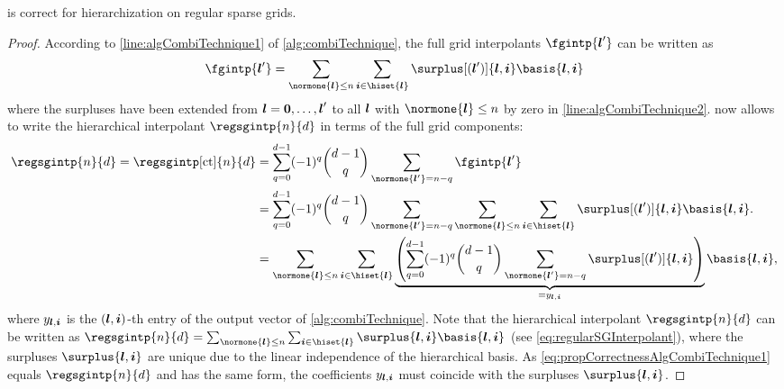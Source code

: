 \begin{proposition}
  \label{prop:correctnessAlgCombiTechnique}
  is correct for hierarchization on regular sparse grids.
\end{proposition}

\begin{proof}
  According to \cref{line:algCombiTechnique1} of \cref{alg:combiTechnique},
  the full grid interpolants $\fgintp{\*l'}$ can be written as
  \begin{equation}
    \fgintp{\*l'}
    = \sum_{\normone{\*l} \le n} \sum_{\*i \in \hiset{\*l}}
    \surplus[(\*l')]{\*l,\*i} \basis{\*l,\*i}
  \end{equation}
  where the surpluses have been extended
  from ${\boldsymbol{l}} = {\boldsymbol{0}}, \dotsc, {\boldsymbol{l}}'$ to all ${\boldsymbol{l}}$ with $\normone{\*l} \le n$
  by zero in \cref{line:algCombiTechnique2}.
   now allows to write the hierarchical
  interpolant $\regsgintp{n}{d}$ in terms of the full grid components:
  \begin{subequations}
    \begin{align}
      \regsgintp{n}{d}
      = \regsgintp[\ct]{n}{d}
      &= \sum_{q=0}^{d-1} (-1)^q \binom{d-1}{q} \sum_{\normone{\*l'} = n-q}
      \fgintp{\*l'}\\
      &= \sum_{q=0}^{d-1} (-1)^q \binom{d-1}{q} \sum_{\normone{\*l'} = n-q}
      \sum_{\normone{\*l} \le n} \sum_{\*i \in \hiset{\*l}}
      \surplus[(\*l')]{\*l,\*i} \basis{\*l,\*i}.\\
      \label{eq:propCorrectnessAlgCombiTechnique1}
      &= \sum_{\normone{\*l} \le n} \sum_{\*i \in \hiset{\*l}}
      \underbrace{
        \paren*{
          \sum_{q=0}^{d-1} (-1)^q \binom{d-1}{q} \sum_{\normone{\*l'} = n-q}
          \surplus[(\*l')]{\*l,\*i}
        }
      }_{= \linout{\*l,\*i}}
      \basis{\*l,\*i},
    \end{align}
  \end{subequations}
  where $\linout{\*l,\*i}$ is the $({\boldsymbol{l}},{\boldsymbol{i}})$-th entry of the output vector
  of \cref{alg:combiTechnique}.
  Note that the hierarchical interpolant $\regsgintp{n}{d}$
  can be written as
  $\regsgintp{n}{d} = \sum_{\normone{\*l} \le n} \sum_{\*i \in \hiset{\*l}}
  \surplus{\*l,\*i} \basis{\*l,\*i}$
  (see \eqref{eq:regularSGInterpolant}),
  where the surpluses $\surplus{\*l,\*i}$ are unique due to the
  linear independence of the hierarchical basis.
  As \eqref{eq:propCorrectnessAlgCombiTechnique1}
  equals $\regsgintp{n}{d}$ and has the same form,
  the coefficients $\linout{\*l,\*i}$
  must coincide with the surpluses $\surplus{\*l,\*i}$.
\end{proof}



